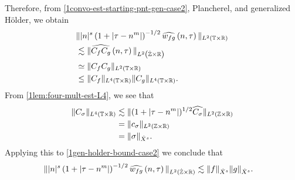 Therefore, from \eqref{1convo-est-starting-pnt-gen-case2}, Plancherel, and generalized 
H\"{o}lder, we obtain
%
%
\begin{equation}
	\label{1gen-holder-bound-case2}
	\begin{split}
		& \| |n|^s \left( 1 + | \tau - n^m | \right )^{-1/2}  \widehat{w_{fg}}\left( 
		n, \tau \right) \|_{L^2(\mathbb{T} \times \mathbb{R})}
		\\
		& \lesssim \|\widehat{C_f C_g }\left( n, \tau \right) 
		\|_{L^2\left( \dot{\mathbb{Z}} \times \mathbb{R} \right)}
		\\
		& \simeq \|C_f C_g \|_{L^2\left( \mathbb{T} \times \mathbb{R} \right)}
		\\
		& \le \|C_f \|_{L^4(\mathbb{T} \times \mathbb{R})} \|C_g \|_{L^4(\mathbb{T} \times \mathbb{R})}.
	\end{split}
\end{equation}
%
From \cref{1lem:four-mult-est-L4}, we see that
%
%
\begin{equation}
	\label{1four-mult-conseq-gen-case2}
	\begin{split}
		\|C_\sigma\|_{L^4(\mathbb{T} \times \mathbb{R})} 
		& \lesssim \|(1 + | \tau - n^m |)^{1/2} \widehat{C_\sigma}
		\|_{L^2(\mathbb{Z} \times \mathbb{R})}
		\\
		& = \|c_{\sigma} \|_{L^2(\mathbb{Z} \times \mathbb{R})} 
		\\
		& = \|\sigma \|_{\dot{X}^s}. 
	\end{split}
\end{equation}
%
%
Applying this to \eqref{1gen-holder-bound-case2} we
conclude that
\begin{equation*}
	\begin{split}
		\| |n|^s \left( 1 + | \tau - n^m | \right ) ^{-1/2} \widehat{w_{fg}}\left( 
		n, \tau \right) \|_{L^2(\dot{\mathbb{Z}} \times \mathbb{R})}
		& \lesssim \|f\|_{\dot{X}^s} \|g\|_{\dot{X}^s}.
	\end{split}
\end{equation*}
%
%
%
